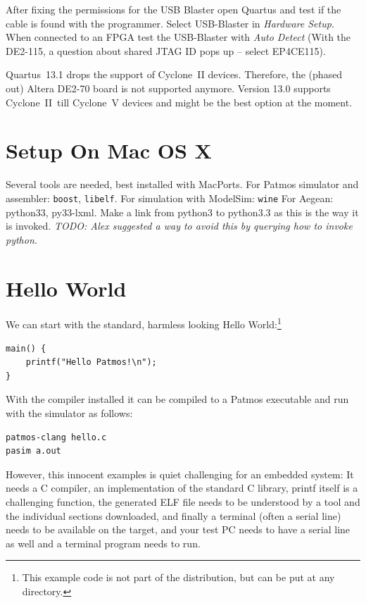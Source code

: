 \documentclass[a4paper,fontsize=10pt,twoside,DIV15,BCOR12mm,headinclude=true,footinclude=false,pagesize,bibtotoc]{scrbook}
\newcommand{\code}[1]{{\texttt{#1}}}
\newcommand{\todo}[1]{{\emph{TODO: #1}}}
\begin{document}
After fixing the permissions for the USB Blaster open Quartus and test if the
cable is found with the programmer. Select USB-Blaster in \emph{Hardware Setup}.
When connected to an FPGA test the USB-Blaster with \emph{Auto Detect}
(With the DE2-115, a question about shared JTAG ID pops up -- select EP4CE115).

Quartus~13.1 drops the support of Cyclone~II devices. Therefore, the
(phased out) Altera DE2-70 board is not supported anymore. Version 13.0 supports Cyclone~II\
till Cyclone~V devices and might be the best option at the moment.

\section{Setup On Mac OS X}

Several tools are needed, best installed with MacPorts. For Patmos simulator and assembler:
\code{boost}, \code{libelf}.
For simulation with ModelSim: \code{wine}
For Aegean: python33, py33-lxml. Make a link from python3 to python3.3 as this is the way it is invoked.
\todo{Alex suggested a way to avoid this by querying how to invoke python.}

\section{Hello World}

We can start with the standard, harmless looking Hello
World:\footnote{This example code is not part of the distribution, but
can be put at any directory.}

\begin{verbatim}
main() {
    printf("Hello Patmos!\n");
}
\end{verbatim}

With the compiler installed it can be compiled to a Patmos executable
and run with the simulator as follows:

\begin{verbatim}
patmos-clang hello.c
pasim a.out
\end{verbatim}

However, this innocent examples is quiet challenging for an embedded system:
It needs a C compiler, an implementation of the standard C library, printf
itself is a challenging function, the generated ELF file needs to be understood
by a tool and the individual sections downloaded, and finally a terminal (often
a serial line) needs to be available on the target, and your test PC needs to
have a serial line as well and a terminal program needs to run.
\end{document}
